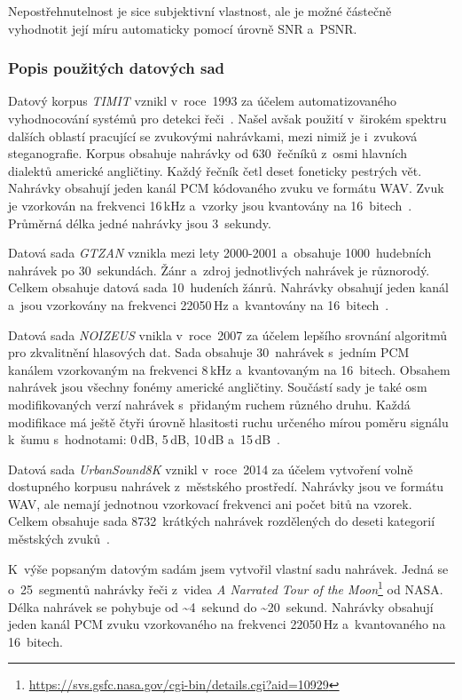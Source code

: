 \noindent Nepostřehnutelnost je sice subjektivní vlastnost, ale je možné
částečně vyhodnotit její míru automaticky pomocí úrovně SNR a~PSNR.

\subsubsection{Popis použitých datových sad}
\label{ssub:dataset-descriptions}

Datový korpus \textit{TIMIT} vznikl v~roce~1993 za účelem automatizovaného
vyhodnocování systémů pro detekci řeči~\cite{Garofolo1993}. Našel avšak použití
v~širokém spektru dalších oblastí pracující se zvukovými nahrávkami, mezi nimiž
je i~zvuková steganografie. Korpus obsahuje nahrávky od 630~řečníků z~osmi
hlavních dialektů americké angličtiny. Každý řečník četl deset foneticky
pestrých vět. Nahrávky obsahují jeden kanál PCM kódovaného zvuku ve formátu
WAV. Zvuk je vzorkován na frekvenci 16\,kHz a~vzorky jsou kvantovány na
16~bitech~\cite{Garofolo1993}. Průměrná délka jedné nahrávky jsou 3~sekundy.

Datová sada \textit{GTZAN} vznikla mezi lety 2000-2001 a~obsahuje
1000~hudebních nahrávek po 30~sekundách. Žánr a~zdroj jednotlivých nahrávek je
různorodý. Celkem obsahuje datová sada 10~hudeních žánrů. Nahrávky obsahují
jeden kanál a~jsou vzorkovány na frekvenci 22050\,Hz a~kvantovány na
16~bitech~\cite{Tzanetakis2001}.

Datová sada \textit{NOIZEUS} vnikla v~roce~2007 za účelem lepšího srovnání
algoritmů pro zkvalitnění hlasových dat. Sada obsahuje 30~nahrávek s~jedním PCM
kanálem vzorkovaným na frekvenci 8\,kHz a~kvantovaným na 16~bitech. Obsahem
nahrávek jsou všechny fonémy americké angličtiny. Součástí sady je také osm
modifikovaných verzí nahrávek s~přidaným ruchem různého druhu. Každá modifikace
má ještě čtyři úrovně hlasitosti ruchu určeného mírou poměru signálu k~šumu
s~hodnotami: 0\,dB, 5\,dB, 10\,dB a~15\,dB~\cite{Hu2006}.

Datová sada \textit{UrbanSound8K} vznikl v~roce~2014 za účelem vytvoření volně
dostupného korpusu nahrávek z~městského prostředí. Nahrávky jsou ve formátu
WAV, ale nemají jednotnou vzorkovací frekvenci ani počet bitů na vzorek. Celkem
obsahuje sada 8732~krátkých nahrávek rozdělených do deseti kategorií městských
zvuků~\cite{Salamon2014}.

K~výše popsaným datovým sadám jsem vytvořil vlastní sadu nahrávek. Jedná se
o~25~segmentů nahrávky řeči z~videa \textit{A Narrated Tour of the
Moon}\footnote{\url{https://svs.gsfc.nasa.gov/cgi-bin/details.cgi?aid=10929}}
od NASA. Délka nahrávek se pohybuje od \textasciitilde4~sekund do
\textasciitilde20~sekund. Nahrávky obsahují jeden kanál PCM zvuku vzorkovaného
na frekvenci 22050\,Hz a~kvantovaného na 16~bitech.

